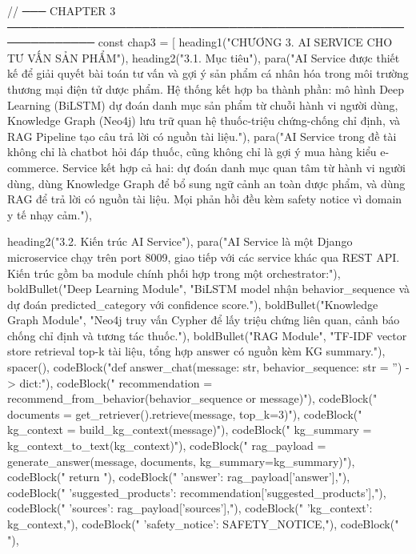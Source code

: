 // ─── CHAPTER 3 ─────────────────────────────────────────────────────────────
const chap3 = [
  heading1("CHƯƠNG 3. AI SERVICE CHO TƯ VẤN SẢN PHẨM"),
  heading2("3.1. Mục tiêu"),
  para("AI Service được thiết kế để giải quyết bài toán tư vấn và gợi ý sản phẩm cá nhân hóa trong môi trường thương mại điện tử dược phẩm. Hệ thống kết hợp ba thành phần: mô hình Deep Learning (BiLSTM) dự đoán danh mục sản phẩm từ chuỗi hành vi người dùng, Knowledge Graph (Neo4j) lưu trữ quan hệ thuốc-triệu chứng-chống chỉ định, và RAG Pipeline tạo câu trả lời có nguồn tài liệu."),
  para("AI Service trong đề tài không chỉ là chatbot hỏi đáp thuốc, cũng không chỉ là gợi ý mua hàng kiểu e-commerce. Service kết hợp cả hai: dự đoán danh mục quan tâm từ hành vi người dùng, dùng Knowledge Graph để bổ sung ngữ cảnh an toàn dược phẩm, và dùng RAG để trả lời có nguồn tài liệu. Mọi phản hồi đều kèm safety notice vì domain y tế nhạy cảm."),

  heading2("3.2. Kiến trúc AI Service"),
  para("AI Service là một Django microservice chạy trên port 8009, giao tiếp với các service khác qua REST API. Kiến trúc gồm ba module chính phối hợp trong một orchestrator:"),
  boldBullet("Deep Learning Module", "BiLSTM model nhận behavior_sequence và dự đoán predicted_category với confidence score."),
  boldBullet("Knowledge Graph Module", "Neo4j truy vấn Cypher để lấy triệu chứng liên quan, cảnh báo chống chỉ định và tương tác thuốc."),
  boldBullet("RAG Module", "TF-IDF vector store retrieval top-k tài liệu, tổng hợp answer có nguồn kèm KG summary."),
  spacer(),
  codeBlock("def answer_chat(message: str, behavior_sequence: str = '') -> dict:"),
  codeBlock("    recommendation = recommend_from_behavior(behavior_sequence or message)"),
  codeBlock("    documents = get_retriever().retrieve(message, top_k=3)"),
  codeBlock("    kg_context = build_kg_context(message)"),
  codeBlock("    kg_summary = kg_context_to_text(kg_context)"),
  codeBlock("    rag_payload = generate_answer(message, documents, kg_summary=kg_summary)"),
  codeBlock("    return {"),
  codeBlock("        'answer': rag_payload['answer'],"),
  codeBlock("        'suggested_products': recommendation['suggested_products'],"),
  codeBlock("        'sources': rag_payload['sources'],"),
  codeBlock("        'kg_context': kg_context,"),
  codeBlock("        'safety_notice': SAFETY_NOTICE,"),
  codeBlock("    }"),

